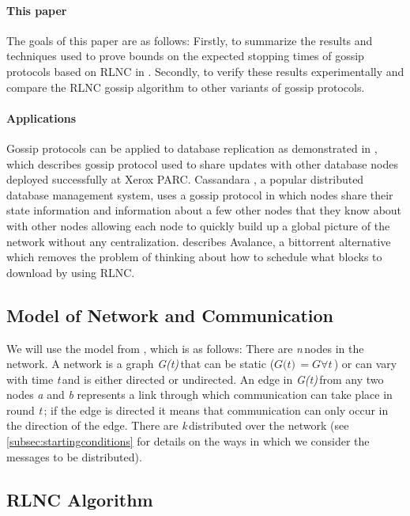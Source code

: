 \documentclass{article} %
\def\numNodes{\textit{n}\,}
\def\graph{\textit{G(t)}\,}
\def\graphtime{\textit{t}\,}
\def\numMessages{\textit{k}\,}
\begin{document}
\paragraph{This paper}
The goals of this paper are as follows: Firstly, to summarize the results and techniques used to prove bounds on the expected stopping times of gossip protocols based on RLNC in \cite{haeupler2011analyzing}. Secondly, to verify these results experimentally and compare the RLNC gossip algorithm to other variants of gossip protocols. 

\paragraph{Applications}
Gossip protocols can be applied to database replication as demonstrated in \cite{demers1987epidemic}, which describes gossip protocol used to share updates with other database nodes deployed successfully at Xerox PARC. Cassandara  \cite{lakshman2010cassandra}, a popular distributed database management system, uses a gossip protocol in which nodes share their state information and information about a few other nodes that they know about with other nodes allowing each node to quickly build up a global picture of the network without any centralization. \cite{export:67453} describes Avalance, a bittorrent alternative which removes the problem of thinking about how to schedule what blocks to download by using RLNC.

\subsection{Model of Network and Communication}
We will use the model from \cite{haeupler2011analyzing}, which is as follows: There are \numNodes nodes in the network. A network is a graph \graph that can be static ($\graph = G  \forall \graphtime$) or can vary with time \graphtime and is either directed or undirected. An edge in \graph from any two nodes \textit{a} and \textit{b} represents a link through which communication can take place in round \graphtime; if the edge is directed it means that communication can only occur in the direction of the edge. There are \numMessages distributed over the network (see \ref{subsec:startingconditions} for details on the ways in which we consider the messages to be distributed).  

\subsection{RLNC Algorithm}\label{subsec:RLNC}
\end{document}
